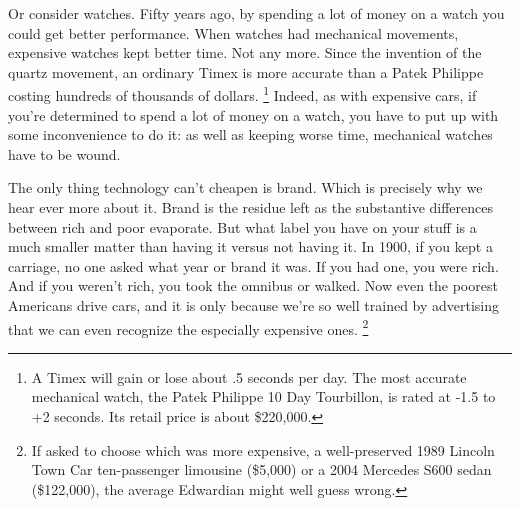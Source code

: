 Or consider watches. Fifty years ago, by spending a lot of money on a
watch you could get better performance. When watches had mechanical
movements, expensive watches kept better time. Not any more. Since the
invention of the quartz movement, an ordinary Timex is more accurate
than a Patek Philippe costing hundreds of thousands of dollars.
\footnote{A Timex will gain or lose about .5 seconds per day. The most
accurate mechanical watch, the Patek Philippe 10 Day Tourbillon, is
rated at -1.5 to +2 seconds. Its retail price is about \$220,000.} Indeed, as with expensive cars, if you're
determined to spend a lot of money on a watch, you have to put up with
some inconvenience to do it: as well as keeping worse time, mechanical
watches have to be wound.

The only thing technology can't cheapen is brand. Which is precisely why
we hear ever more about it. Brand is the residue left as the substantive
differences between rich and poor evaporate. But what label you have on
your stuff is a much smaller matter than having it versus not having it.
In 1900, if you kept a carriage, no one asked what year or brand it was.
If you had one, you were rich. And if you weren't rich, you took the
omnibus or walked. Now even the poorest Americans drive cars, and it is
only because we're so well trained by advertising that we can even
recognize the especially expensive ones. \footnote{If asked to choose which was more expensive, a well-preserved
1989 Lincoln Town Car ten-passenger limousine (\$5,000) or a 2004
Mercedes S600 sedan (\$122,000), the average Edwardian might well guess
wrong.}

